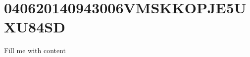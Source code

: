 \documentclass{article}
\begin{document}
\section{040620140943006VMSKKOPJE5UXU84SD}
Fill me with content
\end{document}
